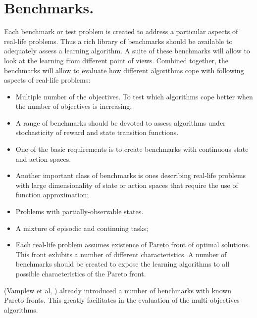 \section{Benchmarks.}

Each benchmark or test problem is created to address a particular aspects of real-life problems. Thus a rich library of benchmarks should be available to adequately assess a learning algorithm. A suite of these benchmarks will allow to look at the learning from different point of views. Combined together, the benchmarks will allow to evaluate how different algorithms cope with following aspects of real-life problems:

\begin{itemize}

\item Multiple number of the objectives. To test which algorithms cope better when the number of objectives is increasing.

\item A range of benchmarks should be devoted to assess algorithms under stochasticity of reward and state transition functions.

\item One of the basic requirements is to create benchmarks with continuous state and action spaces.

\item Another important class of benchmarks is ones describing real-life problems with large dimensionality of state or action spaces that require the use of function approximation;

\item Problems with partially-observable states.

\item A mixture of episodic and continuing tasks;

\item Each real-life problem assumes existence of Pareto front of optimal solutions. This front exhibits a number of different characteristics. A number of benchmarks should be created to expose the learning algorithms to all possible characteristics of the Pareto front.

\end{itemize}

(Vamplew et al, \cite{VamplewDBID2011}) already introduced a number of benchmarks with known Pareto fronts. This greatly facilitates in the evaluation of the multi-objectives algorithms.

